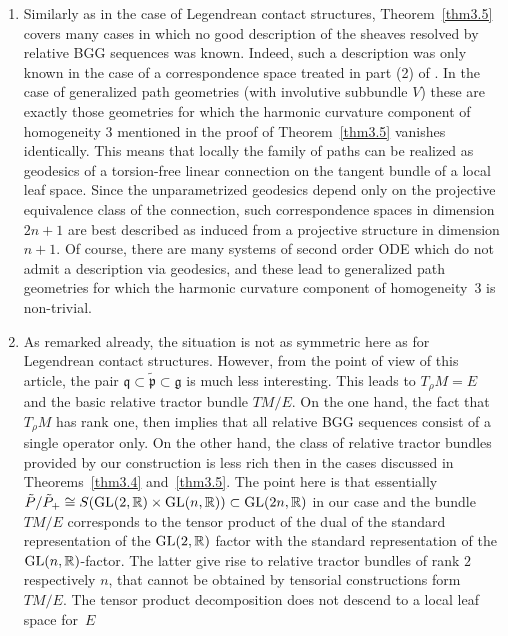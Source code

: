 \documentclass[10pt,a4paper]{amsart}
\numberwithin{equation}{section}
\def\frak{\mathfrak}
\def\Bbb{\mathbb}
\newcommand{\x}{\times}
\begin{document}
\begin{Remark}\label{rem3.5}\quad
\begin{enumerate}\itemsep=0pt
\item[(1)] Similarly as in the case of Legendrean contact structures, Theorem~\ref{thm3.5}
 covers many cases in which no good description of the sheaves resolved by relative
 BGG sequences was known. Indeed, such a description was only known in the case of a
 correspondence space treated in part (2) of \cite[Theorem 4.11]{Rel-BGG2}. In the
 case of generalized path geometries (with involutive subbundle $V$) these are
 exactly those geometries for which the harmonic curvature component of homogeneity
 $3$ mentioned in the proof of Theorem~\ref{thm3.5} vanishes identically. This means
 that locally the family of paths can be realized as geodesics of a torsion-free
 linear connection on the tangent bundle of a local leaf space. Since the
 unparametrized geodesics depend only on the projective equivalence class of the
 connection, such correspondence spaces in dimension $2n+1$ are best described as
 induced from a projective structure in dimension $n+1$. Of course, there are many
 systems of second order ODE which do not admit a description via geodesics, and
 these lead to generalized path geometries for which the harmonic curvature
 component of homogeneity~$3$ is non-trivial.
\item[(2)] As remarked already, the situation is not as symmetric here as for Legendrean
 contact structures. However, from the point of view of this article, the pair
 $\frak q\subset\tilde{\frak p}\subset\frak g$ is much less interesting. This leads
 to $T_\rho M=E$ and the basic relative tractor bundle $TM/E$. On the one hand, the
 fact that $T_\rho M$ has rank one, then implies that all relative BGG sequences
 consist of a single operator only. On the other hand, the class of relative tractor
 bundles provided by our construction is less rich then in the cases discussed in
 Theorems~\ref{thm3.4} and~\ref{thm3.5}. The point here is that essentially $\tilde
 P/\tilde P_+\cong S({\rm GL}(2,\Bbb R)\x {\rm GL}(n,\Bbb R))\subset {\rm GL}(2n,\Bbb R)$ in our case
 and the bundle $TM/E$ corresponds to the tensor product of the dual of the standard
 representation of the ${\rm GL}(2,\Bbb R)$ factor with the standard representation of the
 ${\rm GL}(n,\Bbb R)$-factor. The latter give rise to relative tractor bundles of rank $2$
 respectively $n$, that cannot be obtained by tensorial constructions form~$TM/E$.
 The tensor product decomposition does not descend to a local leaf space for~$E$

\end{enumerate}
\end{Remark}
\end{document}
